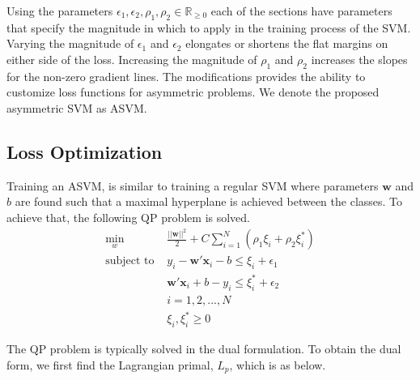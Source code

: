 \documentclass[twoside,11pt]{article}
\begin{document}
Using the parameters $\epsilon_1, \epsilon_2, \rho_1, \rho_2 \in\mathbb{R}_{\geq0}$ each of the sections have parameters that specify the magnitude in which to apply in the training process of the SVM. Varying the magnitude of $\epsilon_1$ and $\epsilon_2$ elongates or shortens the flat margins on either side of the loss. Increasing the magnitude of $\rho_1$ and $\rho_2$ increases the slopes for the non-zero gradient lines. The modifications provides the ability to customize loss functions for asymmetric problems. We denote the proposed asymmetric SVM as ASVM.

\subsection{Loss Optimization}
Training an ASVM, is similar to training a regular SVM where parameters $\mathbf{w}$ and $b$ are found such that a maximal hyperplane is achieved between the classes. To achieve that, the following QP problem is solved.
\begin{equation} \label{Eq:QuantileSVMa}
\begin{array}{cc}
\displaystyle\min_w& \frac{||\mathbf{w}||^2}{2}+C\displaystyle\sum_{i=1}^N(\rho_1\xi_i + \rho_2\xi_i^*) \\
\text{subject to    } & y_i - \mathbf{w}'\mathbf{x}_i - b \leq \xi_i + \epsilon_1 \\
 & \mathbf{w}'\mathbf{x}_i + b -y_i \leq \xi_i^* + \epsilon_2 \\
&i=1,2,...,N\\
&\xi_i,\xi_i^* \geq 0
\end{array}
\end{equation}

The QP problem is typically solved in the dual formulation. To obtain the dual form, we first find the Lagrangian primal, $L_p$, which is as below.
\end{document}
